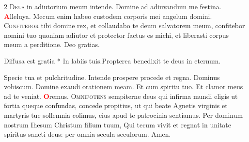 \begin{multicols}{2}
\vspace{+1em}
\newline {}
\newline {}
\newline {}
\lettrine[lines=2]{\zallmancaps \color{Red} D}{eus} in adiutorium meum intende. \R Domine ad adiuvandum me festina. 
\newline \doxology \textcolor{Red}{\bfseries A}lleluya.
\newline {}
\newline {} Mecum enim habeo custodem corporis mei angelum domini.
\newline {}
\lettrine[lines=2]{\zallmancaps \color{Blue} C}{onfitebor} tibi domine rex, et collaudabo te deum salvatorem meum, confitebor nomini tuo quoniam adiutor et protector factus es michi, et liberasti corpus meum a perditione. \R Deo gratias.
\begin{responsory-breve-full}
{Diffusa est gratia * In labiis tuis.}{Propterea benedixit te deus in eternum.}
\end{responsory-breve-full}%
\newline \V Specie tua et pulchritudine. \R Intende prospere procede et regna.
\newline Dominus vobiscum.  Domine exaudi orationem meam.
\newline \R Et cum spiritu tuo.  Et clamor meus ad te veniat.
\newline \textcolor{Red}{\bfseries O}remus. 
\lettrine[lines=2]{\zallmancaps \color{Red} O}{mnipotens} sempiterne deus qui infirma mundi eligis ut fortia queque confundas, concede propitius, ut qui beate Agnetis virginis et martyris tue sollemnia colimus, eius apud te patrocinia sentiamus. Per dominum nostrum Ihesum Christum filium tuum, Qui tecum vivit et regnat in unitate spiritus sancti deus: per omnia secula seculorum. \R Amen.

\end{multicols}
